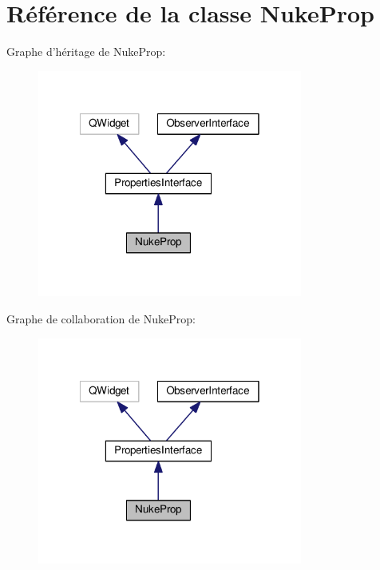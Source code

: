 \hypertarget{classNukeProp}{\section{Référence de la classe Nuke\+Prop}
\label{classNukeProp}
}


Graphe d'héritage de Nuke\+Prop\+:
\nopagebreak
\begin{figure}[H]
\begin{center}
\leavevmode
\includegraphics[width=247pt]{dc/d49/classNukeProp__inherit__graph}
\end{center}
\end{figure}


Graphe de collaboration de Nuke\+Prop\+:
\nopagebreak
\begin{figure}[H]
\begin{center}
\leavevmode
\includegraphics[width=247pt]{d0/db8/classNukeProp__coll__graph}
\end{center}
\end{figure}
